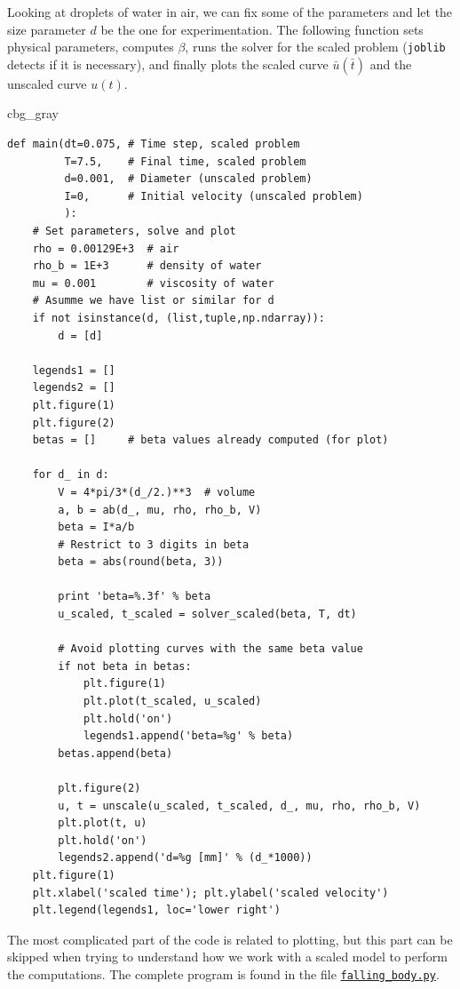 \documentclass[graybox,envcountchap,sectrefs,final]{svmonodo}
\newenvironment{_cod_tight}[1]{
   \def\FrameCommand{\colorbox{#1}}
   \FrameRule0.6pt\MakeFramed {\FrameRestore}\vskip3mm}
   {\vskip0mm\endMakeFramed}
\newenvironment{cod}[1]{
\bgroup\rmfamily
\fboxsep=0mm\relax
\begin{_cod_tight}{#1}
\list{}{\parsep=-2mm\parskip=0mm\topsep=0pt\leftmargin=2mm
\rightmargin=2\leftmargin\leftmargin=4pt\relax}
\item\relax}
{\endlist\end{_cod_tight}\egroup}
\begin{document}
Looking at droplets of water in air, we can fix some of the parameters
and let the size parameter $d$ be the one for experimentation.
The following function sets physical parameters, computes $\beta$,
runs the solver for the scaled problem (\texttt{joblib} detects
if it is necessary), and finally plots the scaled curve
$\bar u(\bar t)$ and the unscaled curve $u(t)$.

\begin{cod}{cbg_gray}\begin{Verbatim}[numbers=none,fontsize=\fontsize{9pt}{9pt},baselinestretch=0.95,xleftmargin=2mm]
def main(dt=0.075, # Time step, scaled problem
         T=7.5,    # Final time, scaled problem
         d=0.001,  # Diameter (unscaled problem)
         I=0,      # Initial velocity (unscaled problem)
         ):
    # Set parameters, solve and plot
    rho = 0.00129E+3  # air
    rho_b = 1E+3      # density of water
    mu = 0.001        # viscosity of water
    # Asumme we have list or similar for d
    if not isinstance(d, (list,tuple,np.ndarray)):
        d = [d]

    legends1 = []
    legends2 = []
    plt.figure(1)
    plt.figure(2)
    betas = []     # beta values already computed (for plot)

    for d_ in d:
        V = 4*pi/3*(d_/2.)**3  # volume
        a, b = ab(d_, mu, rho, rho_b, V)
        beta = I*a/b
        # Restrict to 3 digits in beta
        beta = abs(round(beta, 3))

        print 'beta=%.3f' % beta
        u_scaled, t_scaled = solver_scaled(beta, T, dt)

        # Avoid plotting curves with the same beta value
        if not beta in betas:
            plt.figure(1)
            plt.plot(t_scaled, u_scaled)
            plt.hold('on')
            legends1.append('beta=%g' % beta)
        betas.append(beta)

        plt.figure(2)
        u, t = unscale(u_scaled, t_scaled, d_, mu, rho, rho_b, V)
        plt.plot(t, u)
        plt.hold('on')
        legends2.append('d=%g [mm]' % (d_*1000))
    plt.figure(1)
    plt.xlabel('scaled time'); plt.ylabel('scaled velocity')
    plt.legend(legends1, loc='lower right')
\end{Verbatim}
\end{cod}
\noindent
The most complicated part of the code is related to plotting, but
this part can be skipped when trying to understand how we work with
a scaled model to perform the computations.
The complete program is found in the file
\href{{http://tinyurl.com/o8pb3yy/falling_body.py}}{\nolinkurl{falling_body.py}}.
\end{document}
